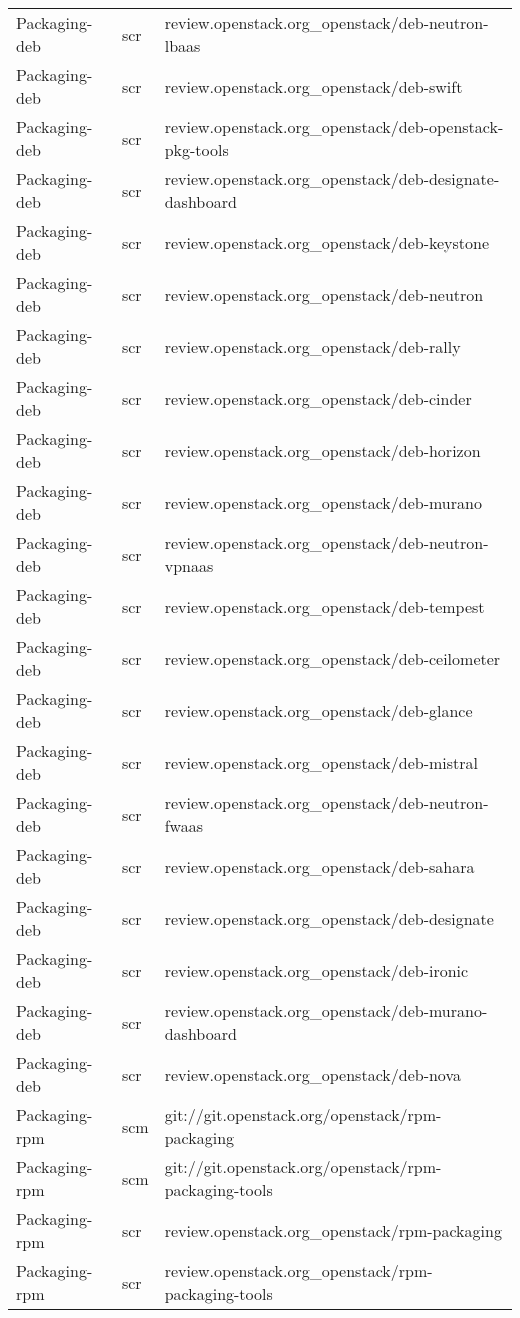 \begin{center}
\begin{longtable}{|p{4cm}|p{1cm}|p{10cm}|}
Packaging-deb&scr&review.openstack.org\_openstack/deb-neutron-lbaas\\ 
Packaging-deb&scr&review.openstack.org\_openstack/deb-swift\\ 
Packaging-deb&scr&review.openstack.org\_openstack/deb-openstack-pkg-tools\\ 
Packaging-deb&scr&review.openstack.org\_openstack/deb-designate-dashboard\\ 
Packaging-deb&scr&review.openstack.org\_openstack/deb-keystone\\ 
Packaging-deb&scr&review.openstack.org\_openstack/deb-neutron\\ 
Packaging-deb&scr&review.openstack.org\_openstack/deb-rally\\ 
Packaging-deb&scr&review.openstack.org\_openstack/deb-cinder\\ 
Packaging-deb&scr&review.openstack.org\_openstack/deb-horizon\\ 
Packaging-deb&scr&review.openstack.org\_openstack/deb-murano\\ 
Packaging-deb&scr&review.openstack.org\_openstack/deb-neutron-vpnaas\\ 
Packaging-deb&scr&review.openstack.org\_openstack/deb-tempest\\ 
Packaging-deb&scr&review.openstack.org\_openstack/deb-ceilometer\\ 
Packaging-deb&scr&review.openstack.org\_openstack/deb-glance\\ 
Packaging-deb&scr&review.openstack.org\_openstack/deb-mistral\\ 
Packaging-deb&scr&review.openstack.org\_openstack/deb-neutron-fwaas\\ 
Packaging-deb&scr&review.openstack.org\_openstack/deb-sahara\\ 
Packaging-deb&scr&review.openstack.org\_openstack/deb-designate\\ 
Packaging-deb&scr&review.openstack.org\_openstack/deb-ironic\\ 
Packaging-deb&scr&review.openstack.org\_openstack/deb-murano-dashboard\\ 
Packaging-deb&scr&review.openstack.org\_openstack/deb-nova\\ 
Packaging-rpm&scm&git://git.openstack.org/openstack/rpm-packaging\\ 
Packaging-rpm&scm&git://git.openstack.org/openstack/rpm-packaging-tools\\ 
Packaging-rpm&scr&review.openstack.org\_openstack/rpm-packaging\\ 
Packaging-rpm&scr&review.openstack.org\_openstack/rpm-packaging-tools\\ 

\end{longtable}
\end{center}
